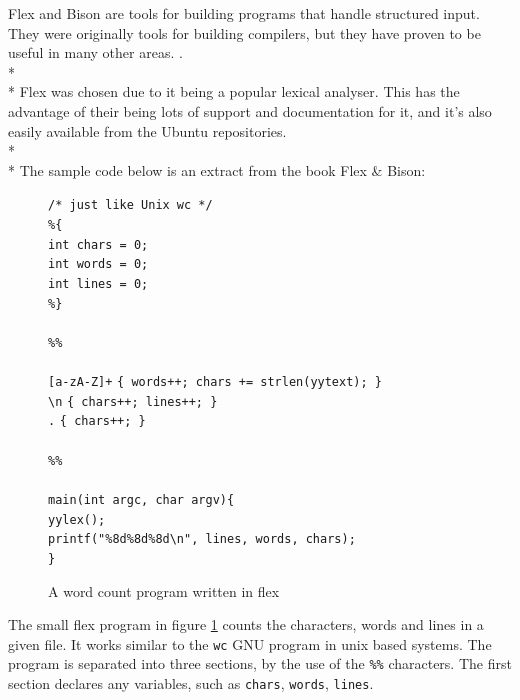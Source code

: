 \documentclass[12pt]{report}
\begin{document}
Flex and Bison are tools for building programs that handle structured input.  They were originally tools for building compilers, but they have proven to be useful in many other areas. \citep{flexandbison09}.
\\*
\\*
Flex was chosen due to it being a popular lexical analyser.  This has the advantage of their being lots of support and documentation for it, and it's also easily available from the Ubuntu repositories.\\*
\\*
The sample code below is an extract from the book Flex \& Bison:
\begin{figure}[H]
	\begin{tabbing}
	\texttt{/* just like Unix wc */}\\
	\texttt{\%\{}\\
	\texttt{int chars = 0;}\\
	\texttt{int words = 0;}\\
	\texttt{int lines = 0;}\=\\
	\texttt{\%\}}\\
	\\
	\texttt{\%\%}
	\\
	\\
	\texttt{[a-zA-Z]+} \> \texttt{\{ words++; chars += strlen(yytext); \}}\\
	\texttt{\textbackslash n} \> \texttt{\{ chars++; lines++; \}}\\
	\texttt{.} \> \texttt{\{ chars++; \}}
	\\
	\\
	\texttt{\%\%}
	\\
	\\
	\texttt{main(int argc, char \*\*argv)\{}\\
	\> \texttt{yylex();}\\
	\> \texttt{printf("\%8d\%8d\%8d\textbackslash n", lines, words, chars);}\\
	\texttt{\}}
	\end{tabbing}
	\caption{A word count program written in flex}\label{fig:flexwc}
	\citep{flexandbison09}
\end{figure}
The small flex program in figure \ref{fig:flexwc} counts the characters, words and lines in a given file.  It works similar to the \texttt{wc} GNU program in unix based systems.  The program is separated into three sections, by the use of the \texttt{\%\%} characters.  The first section declares any variables, such as \texttt{chars}, \texttt{words}, \texttt{lines}.  
\end{document}
